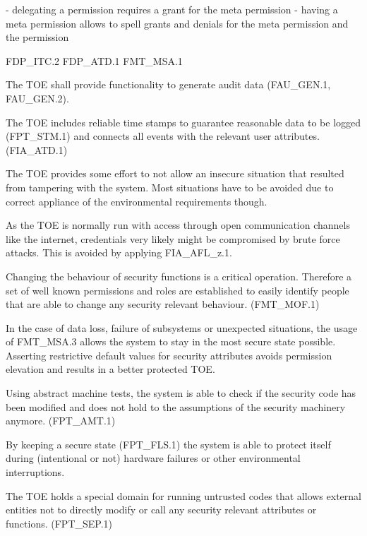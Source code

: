 \documentclass[12pt,english]{scrbook}
\begin{document}

    - delegating a permission requires a grant for the meta permission
    - having a meta permission allows to spell grants and denials for the meta permission and the permission
    
    FDP\_ITC.2
    FDP\_ATD.1
    FMT\_MSA.1


    The TOE shall provide functionality to generate audit data (FAU\_GEN.1,
    FAU\_GEN.2).

    The TOE includes reliable time stamps to guarantee reasonable data to be
    logged (FPT\_STM.1) and connects all events with the relevant user
    attributes. (FIA\_ATD.1)


    The TOE provides some effort to not allow an insecure situation that
    resulted from tampering with the system. Most situations have to be avoided
    due to correct appliance of the environmental requirements though.

    As the TOE is normally run with access through open communication channels
    like the internet, credentials very likely might be compromised by brute
    force attacks. This is avoided by applying FIA\_AFL\_z.1.

    Changing the behaviour of security functions is a critical operation.
    Therefore a set of well known permissions and roles are established to
    easily identify people that are able to change any security relevant
    behaviour. (FMT\_MOF.1)
    
    In the case of data loss, failure of subsystems or unexpected situations,
    the usage of FMT\_MSA.3 allows the system to stay in the most secure state
    possible. Asserting restrictive default values for security attributes
    avoids permission elevation and results in a better protected TOE.
    
    Using abstract machine tests, the system is able to check if the security
    code has been modified and does not hold to the assumptions of the security
    machinery anymore. (FPT\_AMT.1)

    By keeping a secure state (FPT\_FLS.1) the system is able to protect itself
    during (intentional or not) hardware failures or other environmental
    interruptions.
    
    The TOE holds a special domain for running untrusted codes that allows
    external entities not to directly modify or call any security relevant
    attributes or functions. (FPT\_SEP.1)
\end{document}
